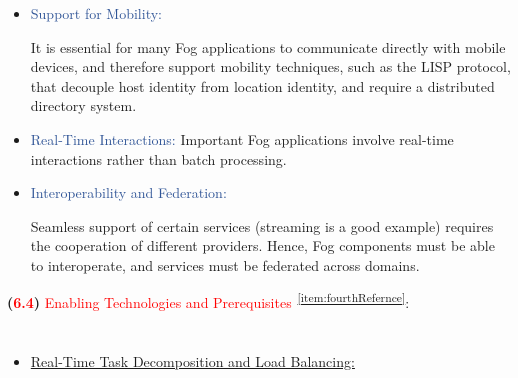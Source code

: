 \documentclass[11pt]{article}
\begin{document}
\vspace{1\baselineskip}
\begin{itemize}
\item {\Large \textcolor[HTML]{2F5496}{Support for Mobility:}}
{\large It is essential for many Fog applications to communicate directly with mobile devices, and therefore support mobility techniques, such as the LISP protocol, that decouple host identity from location identity, and require a distributed directory system.\par}
\end{itemize}

\vspace{1\baselineskip}
\begin{itemize}
\item {\Large \textcolor[HTML]{2F5496}{Real-Time Interactions:}}
{\large Important Fog applications involve real-time interactions rather than batch processing.}
\end{itemize}

\vspace{1\baselineskip}
\begin{itemize}
\item {\Large \textcolor[HTML]{2F5496}{Interoperability and Federation:}}
{\large Seamless support of certain services (streaming is a good example) requires the cooperation of different providers. Hence, Fog components must be able to interoperate, and services must be federated across domains.\par}
\end{itemize}



\newpage

{\LARGE \textbf{(\textcolor[HTML]{FF0000}{6.4})} \textcolor[HTML]{FF0000}{Enabling Technologies and Prerequisites}\textsuperscript{\textcolor[HTML]{0070C0}{~\ref{item:fourthRefernce}}}\textcolor[HTML]{FF0000}{}:}

\section*{}

\begin{itemize}
\item {\large \uline{Real-Time Task Decomposition and Load Balancing:}}
\end{itemize}
\end{document}
